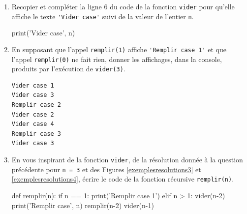 \begin{enumerate}[resume]
\item Recopier et compléter la ligne 6 du code de la fonction \texttt{vider} pour qu'elle affiche le texte \verb|'Vider case'| suivi de la valeur de l'entier \texttt{n}.

\begin{blocvisible}[height=2]
    \begin{CodePythontexAlt}[TaillePolice=\large, Largeur=1\linewidth,Centre,Lignes=true,PremLigne=1]{}
            print('Vider case', n)
    \end{CodePythontexAlt}
\end{blocvisible}

\medskip

\item En supposant que l'appel \texttt{remplir(1)} affiche \verb|'Remplir case 1'| et que l'appel \texttt{remplir(0)} ne fait rien, donner les affichages, dans la console, produits par l'exécution de \texttt{vider(3)}.
\begin{blocvisible}[height=5]
    \begin{verbatim}
Vider case 1
Vider case 3
Remplir case 2
Vider case 2
Vider case 4
Remplir case 3
Vider case 3
\end{verbatim}
\end{blocvisible}

\pagebreak

\item En vous inspirant de la fonction \texttt{vider}, de la résolution donnée à la question précédente pour \texttt{n = 3} et des Figures \ref{exemplesresolutions3} et \ref{exemplesresolutions4}, écrire le code de la fonction récursive \texttt{remplir(n)}.

\begin{blocvisible}[height=6]
    \begin{CodePythontexAlt}[TaillePolice=\large, Largeur=1\linewidth,Centre,Lignes=true,PremLigne=1]{}
    def remplir(n):
        if n == 1:
            print('Remplir case 1')
        elif n > 1:
            vider(n-2)
            print('Remplir case', n)
            remplir(n-2)
            vider(n-1)
    \end{CodePythontexAlt}
\end{blocvisible}
\end{enumerate}